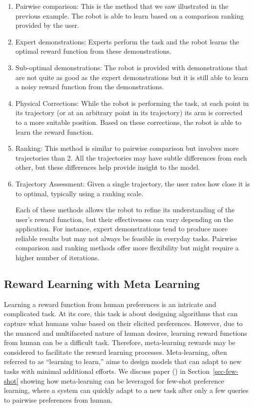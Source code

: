 \documentclass[
  letterpaper,
  numbers=noenddot,
  DIV=11]{scrreprt}
\theoremstyle{definition}
\theoremstyle{plain}
\theoremstyle{plain}
\theoremstyle{remark}
\begin{document}
\begin{enumerate}
\def\labelenumi{\arabic{enumi}.}
\item
  Pairwise comparison: This is the method that we saw illustrated in the
  previous example. The robot is able to learn based on a comparison
  ranking provided by the user.
\item
  Expert demonstrations: Experts perform the task and the robot learns
  the optimal reward function from these demonstrations.
\item
  Sub-optimal demonstrations: The robot is provided with demonstrations
  that are not quite as good as the expert demonstrations but it is
  still able to learn a noisy reward function from the demonstrations.
\item
  Physical Corrections: While the robot is performing the task, at each
  point in its trajectory (or at an arbitrary point in its trajectory)
  its arm is corrected to a more suitable position. Based on these
  corrections, the robot is able to learn the reward function.
\item
  Ranking: This method is similar to pairwise comparison but involves
  more trajectories than 2. All the trajectories may have subtle
  differences from each other, but these differences help provide
  insight to the model.
\item
  Trajectory Assessment: Given a single trajectory, the user rates how
  close it is to optimal, typically using a ranking scale.

  Each of these methods allows the robot to refine its understanding of
  the user's reward function, but their effectiveness can vary depending
  on the application. For instance, expert demonstrations tend to
  produce more reliable results but may not always be feasible in
  everyday tasks. Pairwise comparison and ranking methods offer more
  flexibility but might require a higher number of iterations.
\end{enumerate}

\subsection{Reward Learning with Meta
Learning}\label{reward-learning-with-meta-learning}

Learning a reward function from human preferences is an intricate and
complicated task. At its core, this task is about designing algorithms
that can capture what humans value based on their elicited preferences.
However, due to the nuanced and multifaceted nature of human desires,
learning reward functions from human can be a difficult task. Therefore,
meta-learning rewards may be considered to facilitate the reward
learning processes. Meta-learning, often referred to as ``learning to
learn,'' aims to design models that can adapt to new tasks with minimal
additional efforts. We discuss paper () in Section~\ref{sec-few-shot} showing how
meta-learning can be leveraged for few-shot preference learning, where a
system can quickly adapt to a new task after only a few queries to
pairwise preferences from human.
\end{document}

